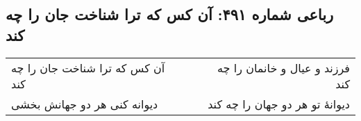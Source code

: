 \begin{center}
\section*{رباعی شماره ۴۹۱: آن کس که ترا شناخت جان را چه کند}
\label{sec:0491}
\begin{longtable}{l p{0.5cm} r}
آن کس که ترا شناخت جان را چه کند
&&
فرزند و عیال و خانمان را چه کند
\\
دیوانه کنی هر دو جهانش بخشی
&&
دیوانهٔ تو هر دو جهان را چه کند
\\
\end{longtable}
\end{center}

